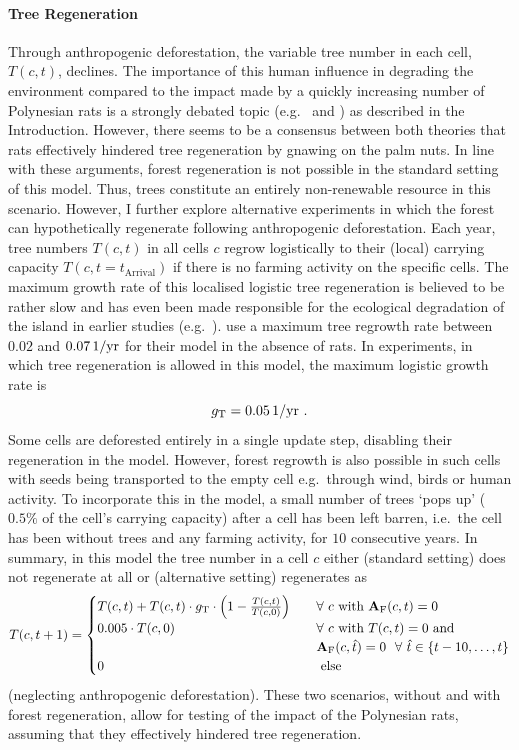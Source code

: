 \paragraph{Tree Regeneration}
Through anthropogenic deforestation, the variable tree number in each cell, $T(c,t)$, declines.
The importance of this human influence in degrading the environment compared to the impact made by a quickly increasing number of Polynesian rats is a strongly debated topic (e.g.\ \citet{Bahn2017} and \citet{Hunt2007}) as described in the Introduction.
However, there seems to be a consensus between both theories that rats effectively hindered tree regeneration by gnawing on the palm nuts.
In line with these arguments, forest regeneration is not possible in the standard setting of this model.
Thus, trees constitute an entirely non-renewable resource in this scenario. 
However, I further explore alternative experiments in which the forest can hypothetically regenerate following anthropogenic deforestation.
Each year, tree numbers $T(c,t)$ in all cells $c$ regrow logistically to their (local) carrying capacity $T(c,t=t_\text{Arrival})$ if there is no farming activity on the specific cells.
The maximum growth rate of this localised logistic tree regeneration is believed to be rather slow and has even been made responsible for the ecological degradation of the island in earlier studies (e.g.\ \citet{Brander1998}).
\citet{Brandt2015} use a maximum tree regrowth rate between $0.02$ and $0.07 \, \rm{1/yr}$ for their model in the absence of rats.
In experiments, in which tree regeneration is allowed in this model, the maximum logistic growth rate is 
\begin{equation}
g_{\rm T} = 0.05\, \rm{1/yr} \ .
\end{equation}
Some cells are deforested entirely in a single update step, disabling their regeneration in the model. 
However, forest regrowth is also possible in such cells with seeds being transported to the empty cell e.g.\ through wind, birds or human activity.
To incorporate this in the model, a small number of trees `pops up' ($0.5\%$ of the cell's carrying capacity) after a cell has been left barren, i.e.\ the cell has been without trees and any farming activity, for $10$ consecutive years.
In summary, in this model the tree number in a cell $c$ either (standard setting) does not regenerate at all or (alternative setting) regenerates as
\begin{equation}\label{eq:treeupdate}
T(c,t+1)= \begin{cases}
T(c,t) + T(c,t) \cdot g_{\rm T} \cdot \left(1- \frac{T(c,t)}{T(c,0)}\right) \quad & \forall \ c \text{ with } \mathbf{A}_{\rm F}(c,t)=0 \\
0.005 \cdot T(c,0)  & \forall  \ c \text{ with } T(c,t)=0 \text{ and}\\
& \mathbf{A}_{\rm F}(c,\hat{t})=0 \  \ \forall \  \hat{t} \in \{t-10, \ldots, t\} \\
0 & \text{ else }
\end{cases}
\end{equation}
(neglecting anthropogenic deforestation).
These two scenarios, without and with forest regeneration, allow for testing of the impact of the Polynesian rats, assuming that they effectively hindered tree regeneration.

